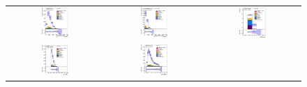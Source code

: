 \clearpage
\begin{figure}[htbp]
\begin{center}
\begin{tabular}{ccc}
%
\includegraphics[width=0.30\textwidth]{appendices/figures/sdrs/JetPtB1_ELEMUONCR0_1W_NOMINAL.eps}  &
\includegraphics[width=0.30\textwidth]{appendices/figures/sdrs/JetPtB2_ELEMUONCR0_1W_NOMINAL.eps} &
\includegraphics[width=0.30\textwidth]{appendices/figures/sdrs/nWhad_ELEMUONCR0_1W_NOMINAL_logscale.eps} \\
\includegraphics[width=0.30\textwidth]{appendices/figures/sdrs/VLQAna_WbX_W1Pt_ELEMUONCR0_1W_NOMINAL.eps} &
\includegraphics[width=0.30\textwidth]{appendices/figures/sdrs/VLQAna_WbX_DRLepMet_ELEMUONCR0_1W_NOMINAL.eps} &

\end{tabular}
\end{center}
\end{figure}
